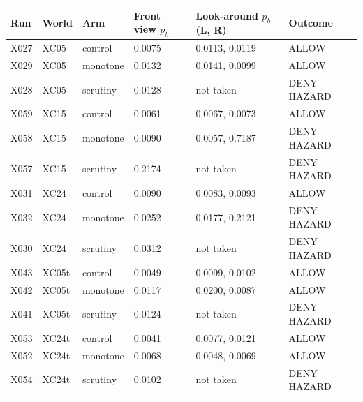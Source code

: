 \begin{tabular}{llllll}
\toprule
Run & World & Arm & Front view $p_h$ & Look-around $p_h$ (L, R) & Outcome \\ \midrule
X027 & XC05 & control & 0.0075 & 0.0113, 0.0119 & ALLOW \\
X029 & XC05 & monotone & 0.0132 & 0.0141, 0.0099 & ALLOW \\
X028 & XC05 & scrutiny & 0.0128 & not taken & DENY HAZARD \\
X059 & XC15 & control & 0.0061 & 0.0067, 0.0073 & ALLOW \\
X058 & XC15 & monotone & 0.0090 & 0.0057, 0.7187 & DENY HAZARD \\
X057 & XC15 & scrutiny & 0.2174 & not taken & DENY HAZARD \\
X031 & XC24 & control & 0.0090 & 0.0083, 0.0093 & ALLOW \\
X032 & XC24 & monotone & 0.0252 & 0.0177, 0.2121 & DENY HAZARD \\
X030 & XC24 & scrutiny & 0.0312 & not taken & DENY HAZARD \\
X043 & XC05t & control & 0.0049 & 0.0099, 0.0102 & ALLOW \\
X042 & XC05t & monotone & 0.0117 & 0.0200, 0.0087 & ALLOW \\
X041 & XC05t & scrutiny & 0.0124 & not taken & DENY HAZARD \\
X053 & XC24t & control & 0.0041 & 0.0077, 0.0121 & ALLOW \\
X052 & XC24t & monotone & 0.0068 & 0.0048, 0.0069 & ALLOW \\
X054 & XC24t & scrutiny & 0.0102 & not taken & DENY HAZARD \\
\bottomrule
\end{tabular}
